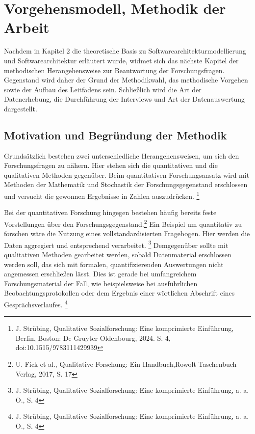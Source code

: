 

\lstset{language=C}

\chapter{Vorgehensmodell, Methodik der Arbeit}

Nachdem in Kapitel 2 die theoretische Basis zu Softwarearchitekturmodellierung und Softwarearchitektur erläutert wurde, widmet sich das nächste Kapitel der methodischen Herangehensweise zur Beantwortung der Forschungsfragen. Gegenstand wird daher der Grund der Methodikwahl, das methodische Vorgehen sowie der Aufbau des Leitfadens sein. Schließlich wird die Art der Datenerhebung, die Durchführung der Interviews und Art der Datenauswertung dargestellt.


\section{Motivation  und Begründung der Methodik}

Grundsätzlich bestehen zwei unterschiedliche Herangehensweisen, um sich den Forschungsfragen zu nähern. Hier stehen sich die quantitativen und die qualitativen Methoden gegenüber. Beim quantitativen Forschungsansatz wird mit Methoden der Mathematik und Stochastik der Forschungsgegenstand erschlossen und versucht die gewonnen Ergebnisse in Zahlen auszudrücken. \footnote {J. Strübing, Qualitative Sozialforschung: Eine komprimierte Einführung, Berlin, Boston: De Gruyter Oldenbourg, 2024. S. 4, doi:10.1515/9783111429939} 

Bei der quantitativen Forschung hingegen bestehen häufig bereits feste Vorstellungen über den Forschungsgegenstand.\footnote{U. Fick et al., Qualitative Forschung: Ein Handbuch,Rowolt Taschenbuch Verlag, 2017, S. 17 }
Ein Beispiel um quantitativ zu forschen wäre die Nutzung eines vollstandardisierten Fragebogen. Hier werden die Daten aggregiert und entsprechend verarbeitet. \footnote {J. Strübing, Qualitative Sozialforschung: Eine komprimierte Einführung, a. a. O., S. 4} 
Demgegenüber sollte mit qualitativen Methoden gearbeitet werden, sobald Datenmaterial erschlossen werden soll, das sich mit formalen, quantifizierenden Auswertungen nicht angemessen erschließen lässt. Dies ist gerade bei umfangreichem Forschungsmaterial der Fall, wie beispielsweise bei ausführlichen Beobachtungsprotokollen oder dem Ergebnis einer wörtlichen Abschrift eines Gesprächsverlaufes. \footnote {J. Strübing, Qualitative Sozialforschung: Eine komprimierte Einführung, a. a. O., S. 4}

